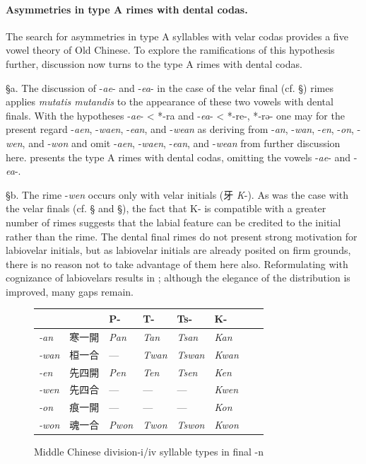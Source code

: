 \paragraph{Asymmetries in type A rimes with dental codas.} The
search for asymmetries in type A syllables with velar codas provides a
five vowel theory of Old Chinese. To explore the ramifications of this
hypothesis further, discussion now turns to the type A rimes with dental
codas.

§a. The discussion of -\emph{ae}- and -\emph{ea}- in the case of the
velar final (cf. §) rimes applies \emph{mutatis mutandis} to the
appearance of these two vowels with dental finals. With the hypotheses
-\emph{ae}- \textless{} *-ra and -\emph{ea}- \textless{} *-re-, *‑rə-
one may for the present regard -\emph{aen}, -\emph{waen}, -\emph{ean},
and -\emph{wean} as deriving from -\emph{an}, -\emph{wan}, -\emph{en},
-\emph{on}, -\emph{wen}, and -\emph{won} and omit -\emph{aen},
-\emph{waen}, -\emph{ean}, and -\emph{wean} from further discussion
here. presents the type A rimes with dental codas, omitting the vowels
-\emph{ae}- and -\emph{ea}-.

§b. The rime -\emph{wen} occurs only with velar initials (牙 \emph{K}-).
As was the case with the velar finals (cf. § and §), the fact that K- is
compatible with a greater number of rimes suggests that the labial
feature can be credited to the initial rather than the rime. The dental
final rimes do not present strong motivation for labiovelar initials,
but as labiovelar initials are already posited on firm grounds, there is
no reason not to take advantage of them here also. Reformulating with
cognizance of labiovelars results in ; although the elegance of the
distribution is improved, many gaps remain.

\begin{figure}
    \centering
\begin{tabular}{|l|l|l|l|l|l|l|l|}
 \hline
&&
P- &
T- &
Ts- &
K- \\ \hline
{\emph{-an}} &
寒一開 &
{\emph{Pan}} &
{\emph{Tan}} &
{\emph{Tsan}} &
{\emph{Kan}} \\ \hline
{\emph{-wan}} &
桓一合 &
--- &
{\emph{Twan}} &
{\emph{Tswan}} &
{\emph{Kwan}} \\ \hline
{\emph{-en}} &
先四開 &
{\emph{Pen}} &
{\emph{Ten}} &
{\emph{Tsen}} &
{\emph{Ken}} \\ \hline
{\emph{-wen}} &
先四合 &
--- &
--- &
--- &
{\emph{Kwen}} \\ \hline
{\emph{-on}} &
痕一開 &
--- &
--- &
--- &
{\emph{Kon}} \\ \hline
{\emph{-won}} &
魂一合 &
{\emph{Pwon}} &
{\emph{Twon}} &
{\emph{Tswon}} &
{\emph{Kwon}} \\ \hline
\end{tabular}
    \caption{Middle Chinese division-i/iv syllable types in final -n \citep[200]{Baxter2014OldChinese}}
    \label{fig:MChi-div-i-iv-final-n}
\end{figure}

